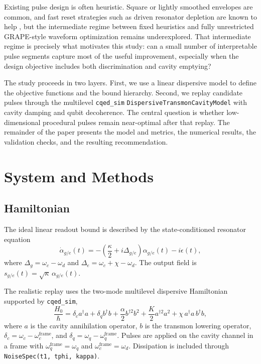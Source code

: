 \documentclass[11pt, a4paper]{article}
\begin{document}
Existing pulse design is often heuristic. Square or lightly smoothed envelopes are common,
and fast reset strategies such as driven resonator depletion are known to help
\cite{mcclure2016rapid}, but the intermediate regime between fixed heuristics and fully
unrestricted GRAPE-style waveform optimization remains underexplored. That intermediate
regime is precisely what motivates this study: can a small number of interpretable pulse
segments capture most of the useful improvement, especially when the design objective
includes both discrimination and cavity emptying?

The study proceeds in two layers. First, we use a linear dispersive model to define the
objective functions and the bound hierarchy. Second, we replay candidate pulses through the
multilevel \texttt{cqed\_sim} \texttt{DispersiveTransmonCavityModel} with cavity damping
and qubit decoherence. The central question is whether low-dimensional procedural pulses
remain near-optimal after that replay. The remainder of the paper presents the model and
metrics, the numerical results, the validation checks, and the resulting recommendation.

\section{System and Methods}

\subsection{Hamiltonian}
The ideal linear readout bound is described by the state-conditioned resonator equation
\begin{equation}
\dot{\alpha}_{g/e}(t) = -\left( \frac{\kappa}{2} + i \Delta_{g/e} \right)\alpha_{g/e}(t) - i \epsilon(t),
\end{equation}
where $\Delta_g = \omega_c - \omega_d$ and $\Delta_e = \omega_c + \chi - \omega_d$.
The output field is $s_{g/e}(t) = \sqrt{\kappa}\,\alpha_{g/e}(t)$.

The realistic replay uses the two-mode multilevel dispersive Hamiltonian supported by
\texttt{cqed\_sim},
\begin{equation}
\frac{H_0}{\hbar} =
\delta_c a^\dagger a +
\delta_q b^\dagger b +
\frac{\alpha}{2} b^{\dagger 2} b^2 +
\frac{K}{2} a^{\dagger 2} a^2 +
\chi\, a^\dagger a\, b^\dagger b,
\end{equation}
where $a$ is the cavity annihilation operator, $b$ is the transmon lowering operator,
$\delta_c = \omega_c - \omega_c^{\mathrm{frame}}$, and
$\delta_q = \omega_q - \omega_q^{\mathrm{frame}}$. Pulses are applied on the cavity
channel in a frame with $\omega_q^{\mathrm{frame}}=\omega_q$ and
$\omega_c^{\mathrm{frame}}=\omega_d$. Dissipation is included through
\texttt{NoiseSpec(t1, tphi, kappa)}.
\end{document}
